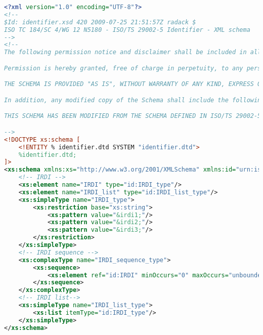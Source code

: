  \begin{lstlisting}[caption=identifier.xsd, language=XML, label=lst:identifier_xsd]
<?xml version="1.0" encoding="UTF-8"?>
<!--
$Id: identifier.xsd 420 2009-07-25 21:51:57Z radack $
ISO TC 184/SC 4/WG 12 N5180 - ISO/TS 29002-5 Identifier - XML schema
-->
<!--
The following permission notice and disclaimer shall be included in all copies of this XML schema ("the Schema"), and derivations of the Schema:

Permission is hereby granted, free of charge in perpetuity, to any person obtaining a copy of the Schema, to use, copy, modify, merge and distribute free of charge, copies of the Schema for the purposes of developing, implementing, installing and using software based on the  Schema, and to permit persons to whom the Schema is furnished to do so, subject to the following conditions:

THE SCHEMA IS PROVIDED "AS IS", WITHOUT WARRANTY OF ANY KIND, EXPRESS OR IMPLIED, INCLUDING BUT NOT LIMITED TO THE WARRANTIES OF MERCHANTABILITY, FITNESS FOR A PARTICULAR PURPOSE AND NONINFRINGEMENT. IN NO EVENT SHALL THE AUTHORS OR COPYRIGHT HOLDERS BE LIABLE FOR ANY CLAIM, DAMAGES OR OTHER LIABILITY, WHETHER IN AN ACTION OF CONTRACT, TORT OR OTHERWISE, ARISING FROM, OUT OF OR IN CONNECTION WITH THE SCHEMA OR THE USE OR OTHER DEALINGS IN THE SCHEMA.

In addition, any modified copy of the Schema shall include the following notice:

THIS SCHEMA HAS BEEN MODIFIED FROM THE SCHEMA DEFINED IN ISO/TS 29002-5, AND SHOULD NOT BE INTERPRETED AS COMPLYING WITH THAT STANDARD.

-->
<!DOCTYPE xs:schema [
	<!ENTITY % identifier.dtd SYSTEM "identifier.dtd">
	%identifier.dtd;
]>
<xs:schema xmlns:xs="http://www.w3.org/2001/XMLSchema" xmlns:id="urn:iso:std:iso:ts:29002:-5:ed-1:tech:xml-schema:identifier" targetNamespace="urn:iso:std:iso:ts:29002:-5:ed-1:tech:xml-schema:identifier" elementFormDefault="qualified" attributeFormDefault="unqualified">
	<!-- IRDI -->
	<xs:element name="IRDI" type="id:IRDI_type"/>
	<xs:element name="IRDI_list" type="id:IRDI_list_type"/>
	<xs:simpleType name="IRDI_type">
		<xs:restriction base="xs:string">
			<xs:pattern value="&irdi1;"/>
			<xs:pattern value="&irdi2;"/>
			<xs:pattern value="&irdi3;"/>
		</xs:restriction>
	</xs:simpleType>
	<!-- IRDI sequence -->
	<xs:complexType name="IRDI_sequence_type">
		<xs:sequence>
			<xs:element ref="id:IRDI" minOccurs="0" maxOccurs="unbounded"/>
		</xs:sequence>
	</xs:complexType>
	<!-- IRDI list-->
	<xs:simpleType name="IRDI_list_type">
		<xs:list itemType="id:IRDI_type"/>
	</xs:simpleType>
</xs:schema>

 \end{lstlisting} 

